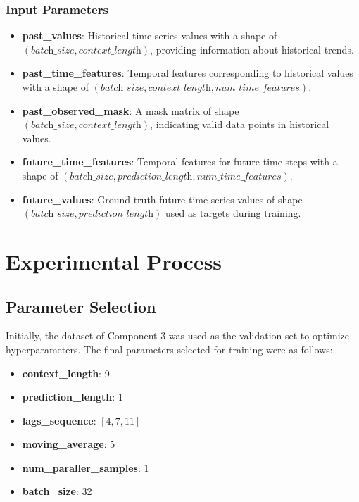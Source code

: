 \subsubsection{Input Parameters}
\begin{itemize}
	\item \textbf{past\_values}: Historical time series values with a shape of \((\textit{batch\_size}, \textit{context\_length})\), providing information about historical trends.
	\item \textbf{past\_time\_features}: Temporal features corresponding to historical values with a shape of \((\textit{batch\_size}, \textit{context\_length}, \textit{num\_time\_features})\).
	\item \textbf{past\_observed\_mask}: A mask matrix of shape \((\textit{batch\_size}, \textit{context\_length})\), indicating valid data points in historical values.
	\item \textbf{future\_time\_features}: Temporal features for future time steps with a shape of \((\textit{batch\_size}, \textit{prediction\_length}, \textit{num\_time\_features})\).
	\item \textbf{future\_values}: Ground truth future time series values of shape \((\textit{batch\_size}, \textit{prediction\_length})\) used as targets during training.
\end{itemize}

\section{Experimental Process}
\label{sec:Experiment}

\subsection{Parameter Selection}
\label{subsec:ParameterSelection}
Initially, the dataset of Component 3 was used as the validation set to optimize hyperparameters. The final parameters selected for training were as follows:
\begin{itemize}
	\item \textbf{context\_length}: 9
	\item \textbf{prediction\_length}: 1
	\item \textbf{lags\_sequence}: \([4, 7, 11]\)
	\item \textbf{moving\_average}: 5
	\item \textbf{num\_paraller\_samples}: 1
	\item \textbf{batch\_size}: 32
\end{itemize}

